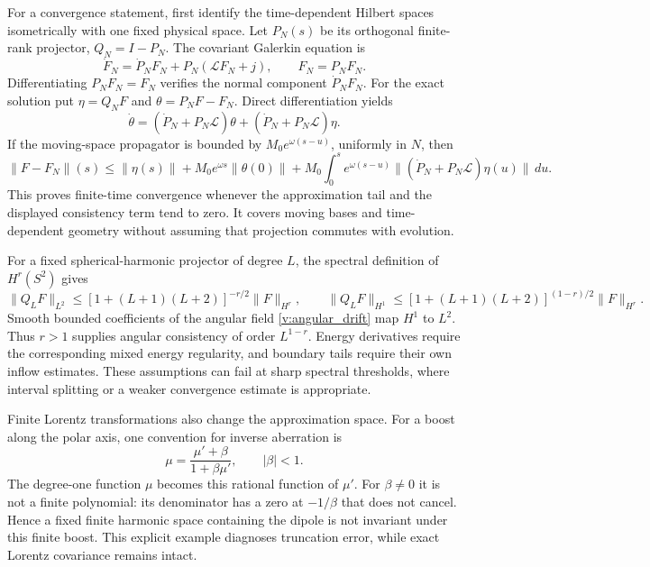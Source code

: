 For a convergence statement, first identify the time-dependent Hilbert spaces isometrically with one fixed physical space. Let $P_N(s)$ be its orthogonal finite-rank projector, $Q_N=I-P_N$. The covariant Galerkin equation is
\begin{equation}
 \dot F_N=\dot P_NF_N+P_N(\mathcal LF_N+j),\qquad F_N=P_NF_N .
 \label{v:projector_galerkin}
\end{equation}
Differentiating $P_NF_N=F_N$ verifies the normal component $\dot P_NF_N$.
For the exact solution put $\eta=Q_NF$ and $\theta=P_NF-F_N$. Direct differentiation yields
\begin{equation}
 \dot\theta=(\dot P_N+P_N\mathcal L)\theta+
 (\dot P_N+P_N\mathcal L)\eta .
 \label{v:galerkin_error}
\end{equation}
If the moving-space propagator is bounded by $M_0e^{\omega(s-u)}$, uniformly in $N$, then
\begin{equation}
 \|F-F_N\|(s)\le\|\eta(s)\|+
 M_0e^{\omega s}\|\theta(0)\|+
 M_0\int_0^se^{\omega(s-u)}
 \|(\dot P_N+P_N\mathcal L)\eta(u)\|\,du .
 \label{v:galerkin_convergence}
\end{equation}
This proves finite-time convergence whenever the approximation tail and the displayed consistency term tend to zero. It covers moving bases and time-dependent geometry without assuming that projection commutes with evolution.

For a fixed spherical-harmonic projector of degree $L$, the spectral definition of $H^r(S^2)$ gives
\begin{equation}
 \|Q_LF\|_{L^2}\le[1+(L+1)(L+2)]^{-r/2}\|F\|_{H^r},\qquad
 \|Q_LF\|_{H^1}\le[1+(L+1)(L+2)]^{(1-r)/2}\|F\|_{H^r}.
 \label{v:harmonic_tail}
\end{equation}
Smooth bounded coefficients of the angular field \eqref{v:angular_drift} map $H^1$ to $L^2$. Thus $r>1$ supplies angular consistency of order $L^{1-r}$. Energy derivatives require the corresponding mixed energy regularity, and boundary tails require their own inflow estimates. These assumptions can fail at sharp spectral thresholds, where interval splitting or a weaker convergence estimate is appropriate.

Finite Lorentz transformations also change the approximation space. For a boost along the polar axis, one convention for inverse aberration is
\begin{equation}
 \mu=\frac{\mu'+\beta}{1+\beta\mu'},\qquad |\beta|<1 .
 \label{v:aberration}
\end{equation}
The degree-one function $\mu$ becomes this rational function of $\mu'$. For $\beta\ne0$ it is not a finite polynomial: its denominator has a zero at $-1/\beta$ that does not cancel. Hence a fixed finite harmonic space containing the dipole is not invariant under this finite boost. This explicit example diagnoses truncation error, while exact Lorentz covariance remains intact.

